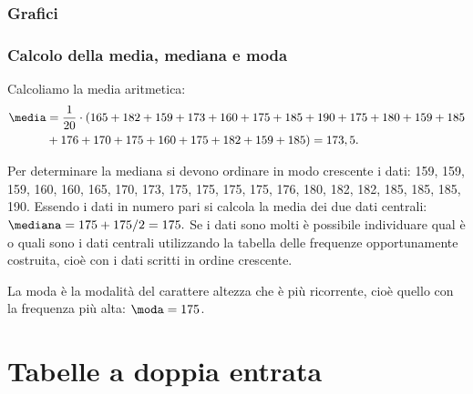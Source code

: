 \begin{esempio}
\subsubsection{Grafici}
\begin{center}
 
\end{center}

\vspace{-24pt}
\subsubsection{Calcolo della media, mediana e moda}

Calcoliamo la media aritmetica:
\begin{equation*}
\begin{split}
\media &= \frac{1}{20} \cdot 
(165+182+159+173+160+175+185+190+175+180+159+185\\
 &+176+170+175+160+175+182+159+185)=173,5.
\end{split}
\end{equation*}

Per determinare la mediana si devono ordinare in modo crescente i dati:
159, 159, 159, 160, 160, 165, 170, 173, 175, 175, 175, 175, 176, 180, 182, 
182, 185, 185, 185, 190.
Essendo i dati in numero pari si calcola la media dei due dati centrali:
\(\mediana = {175+175}/{2}=175.\)
Se i dati sono molti è possibile individuare qual è o quali sono i dati 
centrali utilizzando la tabella delle
frequenze opportunamente costruita, cioè con i dati scritti in ordine 
crescente.

La moda è la modalità del carattere altezza che è più ricorrente, cioè 
quello con la frequenza più alta:
\(\moda = 175\).
\end{esempio}



\section{Tabelle a doppia entrata}
\label{sec:stat02_doppia_entrata}

